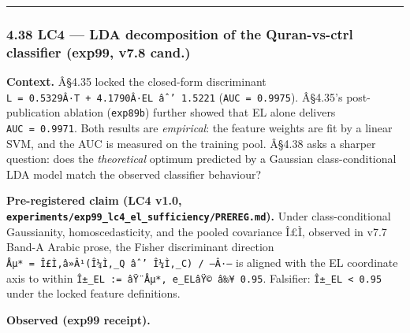\documentclass[
]{article}
\begin{document}
\begin{center}\rule{0.5\linewidth}{0.5pt}\end{center}

\subsubsection{4.38 LC4 --- LDA decomposition of the Quran-vs-ctrl
classifier (exp99, v7.8
cand.)}\label{lc4-lda-decomposition-of-the-quran-vs-ctrl-classifier-exp99-v7.8-cand.}

\textbf{Context.} Â§4.35 locked the closed-form discriminant
\texttt{L\ =\ 0.5329Â·T\ +\ 4.1790Â·EL\ âˆ’\ 1.5221}
(\texttt{AUC\ =\ 0.9975}). Â§4.35's post-publication ablation
(\texttt{exp89b}) further showed that EL alone delivers
\texttt{AUC\ =\ 0.9971}. Both results are \emph{empirical}: the feature
weights are fit by a linear SVM, and the AUC is measured on the training
pool. Â§4.38 asks a sharper question: does the \emph{theoretical}
optimum predicted by a Gaussian class-conditional LDA model match the
observed classifier behaviour?

\textbf{Pre-registered claim (LC4 v1.0,
\texttt{experiments/exp99\_lc4\_el\_sufficiency/PREREG.md}).} Under
class-conditional Gaussianity, homoscedasticity, and the pooled
covariance Î£Ì‚ observed in v7.7 Band-A Arabic prose, the Fisher
discriminant direction
\texttt{Åµ*\ =\ Î£Ì‚â»Â¹(Î¼Ì‚\_Q\ âˆ’\ Î¼Ì‚\_C)\ /\ –Â·–} is aligned
with the EL coordinate axis to within
\texttt{Î±\_EL\ :=\ \textbar{}âŸ¨Åµ*,\ e\_ELâŸ©\textbar{}\ â‰¥\ 0.95}.
Falsifier: \texttt{Î±\_EL\ \textless{}\ 0.95} under the locked feature
definitions.

\textbf{Observed (exp99 receipt).}
\end{document}
